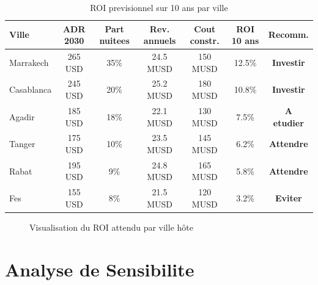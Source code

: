 \documentclass[12pt,a4paper]{report}
\begin{document}
\begin{itemize}[leftmargin=1.5em]
\begin{table}[H]
\centering\small\renewcommand{\arraystretch}{1.5}
\begin{tabular}{lcccccc}
\toprule
\textbf{Ville} & \textbf{ADR 2030} & \textbf{Part nuitees}
  & \textbf{Rev. annuels} & \textbf{Cout constr.}
  & \textbf{ROI 10 ans} & \textbf{Recomm.} \\
\midrule
Marrakech  & 265 USD & 35\% & 24.5 MUSD
  & 150 MUSD & 12.5\%
  & \textcolor{accent}{\textbf{Investir}} \\
Casablanca & 245 USD & 20\% & 25.2 MUSD
  & 180 MUSD & 10.8\%
  & \textcolor{accent}{\textbf{Investir}} \\
Agadir     & 185 USD & 18\% & 22.1 MUSD
  & 130 MUSD & 7.5\%
  & \textcolor{warning}{\textbf{A etudier}} \\
Tanger     & 175 USD & 10\% & 23.5 MUSD
  & 145 MUSD & 6.2\%
  & \textcolor{warning}{\textbf{Attendre}} \\
Rabat      & 195 USD & 9\% & 24.8 MUSD
  & 165 MUSD & 5.8\%
  & \textcolor{warning}{\textbf{Attendre}} \\
Fes        & 155 USD & 8\% & 21.5 MUSD
  & 120 MUSD & 3.2\%
  & \textcolor{danger}{\textbf{Eviter}} \\
\bottomrule
\end{tabular}
\caption{ROI previsionnel sur 10 ans par ville}
\label{tab:roi}
\end{table}

\begin{figure}[H]
\centering
{}
\caption{Visualisation du ROI attendu par ville hôte}
\end{figure}

\section{Analyse de Sensibilite}


\end{itemize}
\end{document}
